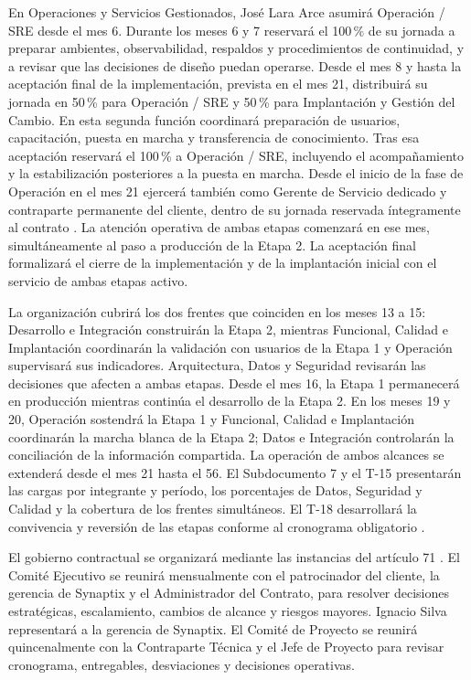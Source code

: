 En Operaciones y Servicios Gestionados, José Lara Arce asumirá Operación / SRE desde el mes 6. Durante los meses 6 y 7 reservará el 100\,\% de su jornada a preparar ambientes, observabilidad, respaldos y procedimientos de continuidad, y a revisar que las decisiones de diseño puedan operarse. Desde el mes 8 y hasta la aceptación final de la implementación, prevista en el mes 21, distribuirá su jornada en 50\,\% para Operación / SRE y 50\,\% para Implantación y Gestión del Cambio. En esta segunda función coordinará preparación de usuarios, capacitación, puesta en marcha y transferencia de conocimiento. Tras esa aceptación reservará el 100\,\% a Operación / SRE, incluyendo el acompañamiento y la estabilización posteriores a la puesta en marcha. Desde el inicio de la fase de Operación en el mes 21 ejercerá también como Gerente de Servicio dedicado y contraparte permanente del cliente, dentro de su jornada reservada íntegramente al contrato \parencite[RT-21.02, p.~35]{bases-transversales}. La atención operativa de ambas etapas comenzará en ese mes, simultáneamente al paso a producción de la Etapa 2. La aceptación final formalizará el cierre de la implementación y de la implantación inicial con el servicio de ambas etapas activo.

La organización cubrirá los dos frentes que coinciden en los meses 13 a 15: Desarrollo e Integración construirán la Etapa 2, mientras Funcional, Calidad e Implantación coordinarán la validación con usuarios de la Etapa 1 y Operación supervisará sus indicadores. Arquitectura, Datos y Seguridad revisarán las decisiones que afecten a ambas etapas. Desde el mes 16, la Etapa 1 permanecerá en producción mientras continúa el desarrollo de la Etapa 2. En los meses 19 y 20, Operación sostendrá la Etapa 1 y Funcional, Calidad e Implantación coordinarán la marcha blanca de la Etapa 2; Datos e Integración controlarán la conciliación de la información compartida. La operación de ambos alcances se extenderá desde el mes 21 hasta el 56. El Subdocumento 7 y el T-15 presentarán las cargas por integrante y período, los porcentajes de Datos, Seguridad y Calidad y la cobertura de los frentes simultáneos. El T-18 desarrollará la convivencia y reversión de las etapas conforme al cronograma obligatorio \parencite[art.~17, pp.~12--13; Formulario T-22, p.~68]{bases-admin}.

El gobierno contractual se organizará mediante las instancias del artículo 71 \parencite[art.~71, pp.~37--38]{bases-admin}. El Comité Ejecutivo se reunirá mensualmente con el patrocinador del cliente, la gerencia de Synaptix y el Administrador del Contrato, para resolver decisiones estratégicas, escalamiento, cambios de alcance y riesgos mayores. Ignacio Silva representará a la gerencia de Synaptix. El Comité de Proyecto se reunirá quincenalmente con la Contraparte Técnica y el Jefe de Proyecto para revisar cronograma, entregables, desviaciones y decisiones operativas.

